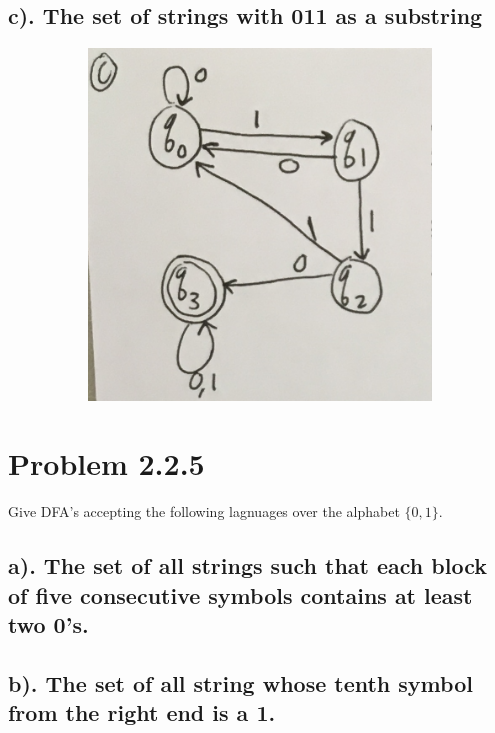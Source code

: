 \documentclass[20pt]{article} %
\begin{document}
\subsection{c). The set of strings with 011 as a substring}
\begin{figure}[!htbp]
  	\centering
   	\begin{subfigure}[p]{0.6\linewidth}
    	\includegraphics[width=\linewidth]{./figures/H1c.png}
   	\end{subfigure}
\end{figure} 
\newpage
\section{Problem 2.2.5}
Give DFA's accepting the following lagnuages over the alphabet $\{0,1\}$.
\subsection{a). The set of all strings such that each block of five consecutive symbols contains at least two 0's.}

\subsection{b). The set of all string whose tenth symbol from the right end is a 1.}
\end{document}
